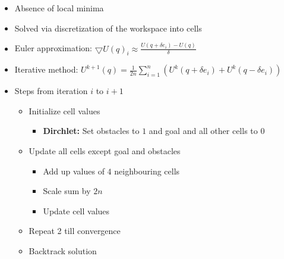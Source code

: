 \documentclass[a4paper]{article}
\newcommand{\ipro}{\item[+]}
\newcommand{\icon}{\item[-]}
\newcommand{\ides}[1]{\item \textbf{#1}}
\begin{document}
\begin{itemize}
\begin{itemize}
\begin{itemize}
\begin{itemize*}
                        \end{itemize*}
                    \ides{Dirchlet:}
                \end{itemize}
            \ipro Absence of local minima
            \item Solved via discretization of the workspace into cells
            \item Euler approximation: $\bigtriangledown U(q)_i \approx \frac{U(q + \delta e_i) - U(q)}{\delta}$
            \item Iterative method: $U^{k+1}(q) = \frac{1}{2n} \sum_{i=1}^{n} (U^k(q + \delta e_i) + U^k(q - \delta e_i))$\\
            \item Steps from iteration $i$ to $i+1$
                \begin{itemize}
                    \item[1)] Initialize cell values
                        \begin{itemize}
                            \ides{Dirchlet:} Set obstacles to $1$ and goal and all other cells to $0$
                        \end{itemize}
                    \item[2)] Update all cells except goal and obstacles
                        \begin{itemize}
                            \item[a)] Add up values of $4$ neighbouring cells
                            \item[b)] Scale sum by $2n$
                            \item[c)] Update cell values
                        \end{itemize}
                    \item[3)] Repeat 2 till convergence
                    \item[4)] Backtrack solution
                \end{itemize}
        \end{itemize}
\end{itemize}
\end{document}
